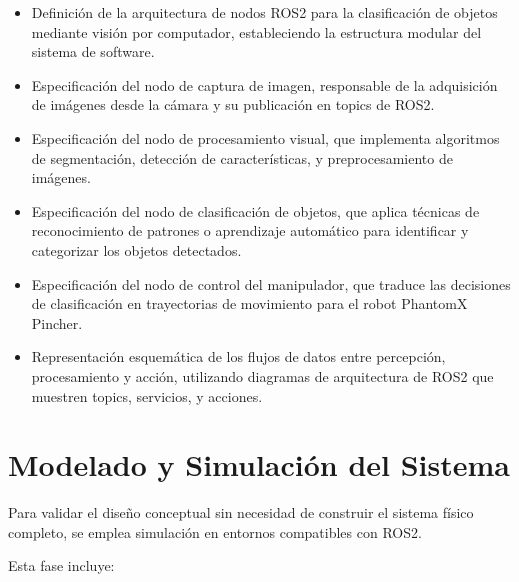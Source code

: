 \begin{itemize}
    \item Definición de la arquitectura de nodos ROS2 para la clasificación de objetos mediante visión por computador, estableciendo la estructura modular del sistema de software.
    
    \item Especificación del nodo de captura de imagen, responsable de la adquisición de imágenes desde la cámara y su publicación en topics de ROS2.
    
    \item Especificación del nodo de procesamiento visual, que implementa algoritmos de segmentación, detección de características, y preprocesamiento de imágenes.
    
    \item Especificación del nodo de clasificación de objetos, que aplica técnicas de reconocimiento de patrones o aprendizaje automático para identificar y categorizar los objetos detectados.
    
    \item Especificación del nodo de control del manipulador, que traduce las decisiones de clasificación en trayectorias de movimiento para el robot PhantomX Pincher.
    
    \item Representación esquemática de los flujos de datos entre percepción, procesamiento y acción, utilizando diagramas de arquitectura de ROS2 que muestren topics, servicios, y acciones.
\end{itemize}

\section{Modelado y Simulación del Sistema}

Para validar el diseño conceptual sin necesidad de construir el sistema físico completo, se emplea simulación en entornos compatibles con ROS2.

Esta fase incluye:

